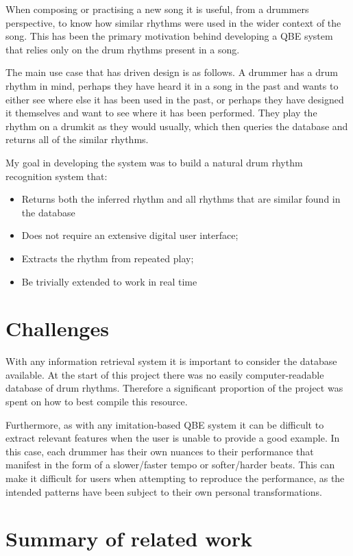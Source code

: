 \documentclass[12pt,twoside,notitlepage]{report}
\begin{document}
	When composing or practising a new song it is useful, from a drummers perspective, to know how similar rhythms were used in the wider context of the song. This has been the primary motivation behind developing a QBE system that relies only on the drum rhythms present in a song. 
	
	The main use case that has driven design is as follows. A drummer has a drum rhythm in mind, perhaps they have heard it in a song in the past and wants to either see where else it has been used in the past, or perhaps they have designed it themselves and want to see where it has been performed. They play the rhythm on a drumkit as they would usually, which then queries the database and returns all of the similar rhythms.
	
	My goal in developing the system was to build a natural drum rhythm recognition system that:
	\begin{itemize}
		\item{Returns both the inferred rhythm and all rhythms that are similar found in the database}
		\item{Does not require an extensive digital user interface;}
		\item{Extracts the rhythm from repeated play;}
		\item{Be trivially extended to work in real time}
	\end{itemize}	

	\section{Challenges}
	With any information retrieval system it is important to consider the database available. At the start of this project there was no easily computer-readable database of drum rhythms. Therefore a significant proportion of the project was spent on how to best compile this resource.
	
	Furthermore, as with any imitation-based QBE system it can be difficult to extract relevant features when the user is unable to provide a good example. In this case, each drummer has their own nuances to their performance that manifest in the form of a slower/faster tempo or softer/harder beats. This can make it difficult for users when attempting to reproduce the performance, as the intended patterns have been subject to their own personal transformations.
	
	
	\section{\label{sec:SummaryOfRelatedWork}Summary of related work}
	
\end{document}
